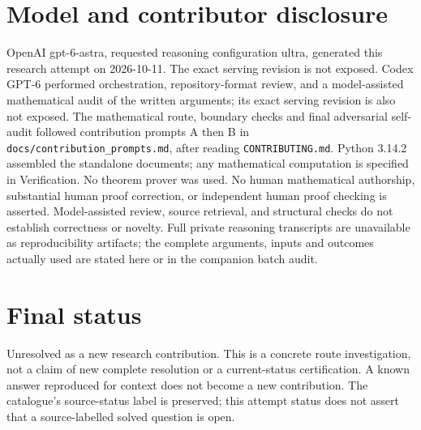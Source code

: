 \documentclass[11pt]{article}
\begin{document}
\section{Model and contributor disclosure}
OpenAI gpt-6-astra, requested reasoning configuration ultra, generated this research
attempt on 2026-10-11. The exact serving revision is not exposed. Codex GPT-6
performed orchestration, repository-format review, and a model-assisted mathematical
audit of the written arguments; its exact serving revision
is also not exposed. The mathematical route, boundary checks and final adversarial
self-audit followed contribution prompts A then B in
\texttt{docs/contribution\_prompts.md}, after reading \texttt{CONTRIBUTING.md}.
Python 3.14.2 assembled the standalone documents; any mathematical computation is
specified in Verification. No theorem prover was used. No human mathematical
authorship, substantial human proof correction, or independent human proof checking
is asserted. Model-assisted review, source retrieval, and structural checks do not
establish correctness or novelty. Full private reasoning transcripts are unavailable
as reproducibility artifacts; the complete arguments, inputs and outcomes actually
used are stated here or in the companion batch audit.
\section{Final status}
Unresolved as a new research contribution. This is a concrete route investigation,
not a claim of new complete resolution or a current-status certification. A known
answer reproduced for context does not become a new contribution. The catalogue's
source-status label is preserved; this attempt status does not assert that a
source-labelled solved question is open.
\end{document}

